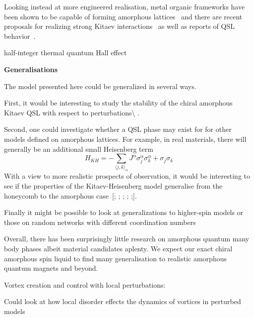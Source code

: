 Looking instead at more engineered realisation, metal organic frameworks have been shown to be capable of forming amorphous lattices~\autocite{bennett2014amorphous} and there are recent proposals for realizing strong Kitaev interactions~\autocite{yamadaDesigningKitaevSpin2017} as well as reports of QSL behavior~\autocite{misumiQuantumSpinLiquid2020}.

half-integer thermal quantum Hall effect~\autocite{kasaharaMajoranaQuantizationHalfinteger2018,yokoiHalfintegerQuantizedAnomalous2021}

\textbf{Generalisations}

The model presented here could be generalized in several ways.

First, it would be interesting to study the stability of the chiral amorphous Kitaev QSL with respect to perturbations\textbackslash{} \autocite{Rau2014,Chaloupka2010,Chaloupka2013,Chaloupka2015,Winter2016}.

Second, one could investigate whether a QSL phase may exist for for other models defined on amorphous lattices. For example, in real materials, there will generally be an additional small Heisenberg term \[H_{KH} =  - \sum_{\langle j,k\rangle_\alpha} J^{\alpha}\sigma_j^{\alpha}\sigma_k^{\alpha} + \sigma_j\sigma_k\] With a view to more realistic prospects of observation, it would be interesting to see if the properties of the Kitaev-Heisenberg model generalise from the honeycomb to the amorphous case~{[}\textcite{Chaloupka2010}; \textcite{Chaloupka2015}; \textcite{Jackeli2009}; \textcite{Kalmeyer1989}; \textcite{manousakisSpinTextonehalfHeisenberg1991};{]}.

Finally it might be possible to look at generalizations to higher-spin models or those on random networks with different coordination numbers~\autocite{Baskaran2008,Yao2009,Nussinov2009,Yao2011,Chua2011,Natori2020,Chulliparambil2020,Chulliparambil2021,Seifert2020,WangHaoranPRB2021,Wu2009}

Overall, there has been surprisingly little research on amorphous quantum many body phases albeit material candidates aplenty. We expect our exact chiral amorphous spin liquid to find many generalisation to realistic amorphous quantum magnets and beyond.

Vortex creation and control with local perturbations:~\autocite{jangVortexCreationControl2021}

Could look at how local disorder effects the dynamics of vortices in perturbed models~\autocite{joyDynamicsVisonsThermal2022}

